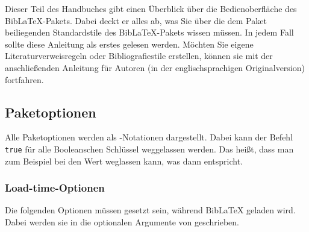 \documentclass{ltxdockit}[2011/03/25]
\newcommand*{\biblatex}{BibLaTeX\xspace}
\begin{document}
Dieser Teil des Handbuches gibt einen Überblick über die
Bedienoberfläche des \biblatex-Pakets. Dabei deckt er alles ab, was Sie
über die dem Paket beiliegenden Standardstile des \biblatex-Pakets wissen
müssen. In jedem Fall sollte diese Anleitung als erstes gelesen werden. Möchten
Sie eigene Literaturverweisregeln oder Bibliografiestile erstellen, können sie
mit der anschließenden Anleitung für Autoren (in der englischsprachigen Originalversion)
fortfahren.

\subsection{Paketoptionen} \label{use:opt} 

Alle Paketoptionen werden als \keyval-Notationen dargestellt. Dabei kann der
Befehl \texttt{true} für alle Booleanschen Schlüssel weggelassen werden. Das
heißt, dass man zum Beispiel bei  den Wert weglassen kann, was
dann  entspricht.

\subsubsection{Load-time-Optionen} \label{use:opt:ldt} 

Die folgenden Optionen müssen gesetzt sein, während \biblatex geladen wird.
Dabei werden sie in die optionalen Argumente von  geschrieben.
\end{document}
